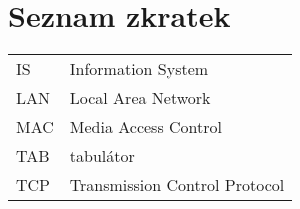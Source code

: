 \section*{Seznam zkratek}
\vspace{2em}

\noindent
\begin{tabular}{@{}ll@{}}
IS	&	Information System\\
LAN	&	Local Area Network\\
MAC	&	Media Access Control\\
TAB	&	tabulátor \\
TCP	&	Transmission Control Protocol
\end{tabular}


